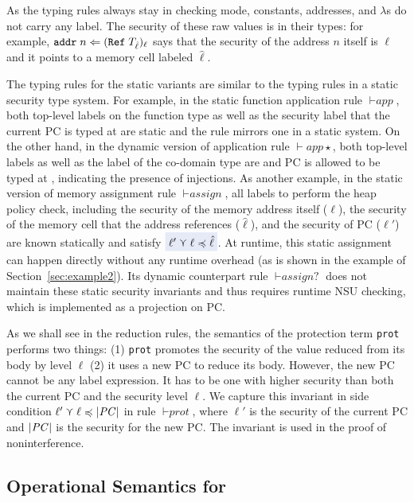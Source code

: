 As the typing rules always stay in checking mode, constants,
addresses, and $\lambda$s do not carry any label. The security of
these raw values is in their types: for example,
$\text{\texttt{{addr}}}\;{n} \Leftarrow (\mathtt{Ref}\;{T_{\hat{\ell}}})_\ell$ says that the
security of the address $n$ itself is $\ell$ and it points to a memory
cell labeled $\hat{\ell}$.

The typing rules for the static variants are similar to the typing
rules in a static security type system.  For example, in the static
function application rule ${\vdash}\textit{app}$, both top-level
labels on the function type as well as the security label that the
current PC is typed at are static and the rule mirrors one in a static
system.  On the other hand, in the dynamic version of application rule
${\vdash}\textit{app}\star$, both top-level labels as well as the label
of the co-domain type are \unk and PC is allowed to be typed at \unk,
indicating the presence of injections.
As another example, in the static version of memory assignment rule
${\vdash}\textit{assign}$, all labels to perform the heap policy
check, including the security of the memory address itself ($\ell$),
the security of the memory cell that the address references
($\hat{\ell}$), and the security of PC ($\ell'$) are known statically
and satisfy $\highlightblue{\ell' \curlyvee \ell \preccurlyeq \hat{\ell}}$.
At runtime, this static assignment
can happen directly without any runtime overhead (as is shown in the
example of Section~\ref{sec:example2}). Its dynamic counterpart rule
${\vdash}\textit{assign?}$ does not maintain these static security
invariants and thus requires runtime NSU checking, which is
implemented as a projection on PC.

As we shall see in the reduction rules, the semantics of the
protection term \texttt{prot} performs two things: (1) \texttt{prot} promotes
the security of the value reduced from its body by level $\ell$
(2) it uses a new PC to reduce its body.
However, the new PC cannot be any label expression. It has to be one with
higher security than both the current PC and the security level $\ell$.
We capture this invariant in side condition $\ell' \curlyvee \ell \preccurlyeq |\mathit{PC}|$
in rule ${\vdash}\textit{prot}$, where $\ell'$ is the security of the current PC
and $|\mathit{PC}|$ is the security for the new PC.
The invariant is used in the proof of noninterference.

\subsection{Operational Semantics for \CC}
\label{sec:cc-semantics}

